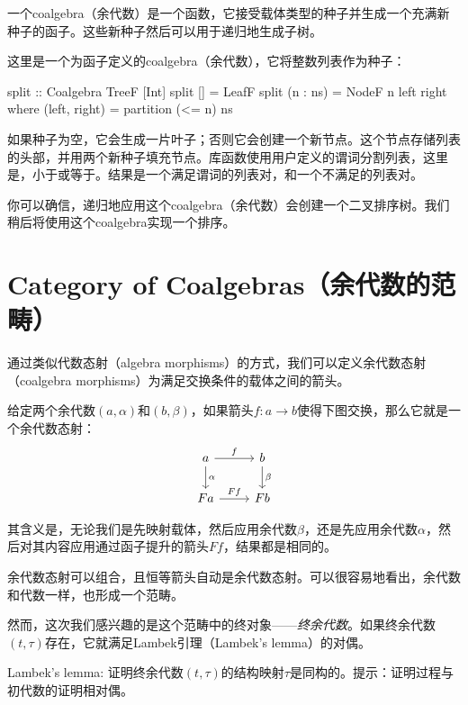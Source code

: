 \documentclass[DaoFP]{subfiles}
\begin{document}
    一个coalgebra（余代数）是一个函数，它接受载体类型的种子并生成一个充满新种子的函子。这些新种子然后可以用于递归地生成子树。

    这里是一个为函子定义的coalgebra（余代数），它将整数列表作为种子：
    \begin{haskell}
        split :: Coalgebra TreeF [Int]
        split [] = LeafF
        split (n : ns) = NodeF n left right
        where
        (left, right) = partition (<= n) ns
    \end{haskell}
    如果种子为空，它会生成一片叶子；否则它会创建一个新节点。这个节点存储列表的头部，并用两个新种子填充节点。库函数使用用户定义的谓词分割列表，这里是，小于或等于。结果是一个满足谓词的列表对，和一个不满足的列表对。

    你可以确信，递归地应用这个coalgebra（余代数）会创建一个二叉排序树。我们稍后将使用这个coalgebra实现一个排序。

    \section{Category of Coalgebras（余代数的范畴）}

    通过类似代数态射（algebra morphisms）的方式，我们可以定义余代数态射（coalgebra morphisms）为满足交换条件的载体之间的箭头。

    给定两个余代数$(a, \alpha)$和$(b, \beta)$，如果箭头$f \colon a \to b$使得下图交换，那么它就是一个余代数态射：
    \[
        \begin{tikzcd}
            a
            \arrow[r, "f"]
            \arrow[d, "\alpha"]
            & b
            \arrow[d, "\beta"]
            \\
            F  a
            \arrow[r, "F f"]
            & F b
        \end{tikzcd}
    \]

    其含义是，无论我们是先映射载体，然后应用余代数$\beta$，还是先应用余代数$\alpha$，然后对其内容应用通过函子提升的箭头$F f$，结果都是相同的。

    余代数态射可以组合，且恒等箭头自动是余代数态射。可以很容易地看出，余代数和代数一样，也形成一个范畴。

    然而，这次我们感兴趣的是这个范畴中的终对象——\emph{终余代数}。如果终余代数$(t, \tau)$存在，它就满足Lambek引理（Lambek's lemma）的对偶。

    \begin{exercise}{Lambek's lemma:}
        证明终余代数$(t, \tau)$的结构映射$\tau$是同构的。提示：证明过程与初代数的证明相对偶。
    \end{exercise}
\end{document}
